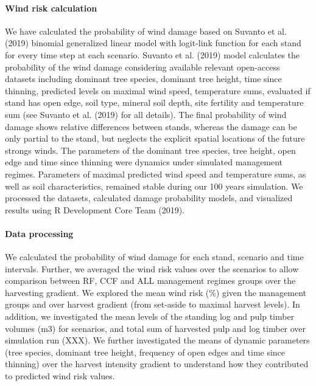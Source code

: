 \documentclass[]{elsarticle} %
\begin{document}
\paragraph{Wind risk calculation}\label{wind-risk-calculation}

We have calculated the probability of wind damage based on Suvanto et
al. (2019) binomial generalized linear model with logit-link function
for each stand for every time step at each scenario. Suvanto et al.
(2019) model calculates the probability of the wind damage considering
available relevant open-access datasets including dominant tree species,
dominant tree height, time since thinning, predicted levels on maximal
wind speed, temperature sums, evaluated if stand has open edge, soil
type, mineral soil depth, site fertility and temperature sum (see
Suvanto et al. (2019) for all details). The final probability of wind
damage shows relative differences between stands, whereas the damage can
be only partial to the stand, but neglects the explicit spatial
locations of the future strongs winds. The parameters of the dominant
tree species, tree height, open edge and time since thinning were
dynamics under simulated management regimes. Parameters of maximal
predicted wind speed and temperature sums, as well as soil
characteristics, remained stable during our 100 years simulation. We
processed the datasets, calculated damage probability models, and
visualized results using R Development Core Team (2019).

\paragraph{Data processing}\label{data-processing}

We calculated the probability of wind damage for each stand, scenario
and time intervals. Further, we averaged the wind risk values over the
scenarios to allow comparison between RF, CCF and ALL management regimes
groups over the harvesting gradient. We explored the mean wind risk (\%)
given the management groups and over harvest gradient (from set-aside to
maximal harvest levels). In addition, we investigated the mean levels of
the standing log and pulp timber volumes (m3) for scenarios, and total
sum of harvested pulp and log timber over simulation run (XXX). We
further investigated the means of dynamic parameters (tree species,
dominant tree height, frequency of open edges and time since thinning)
over the harvest intensity gradient to understand how they contributed
to predicted wind risk values.
\end{document}
